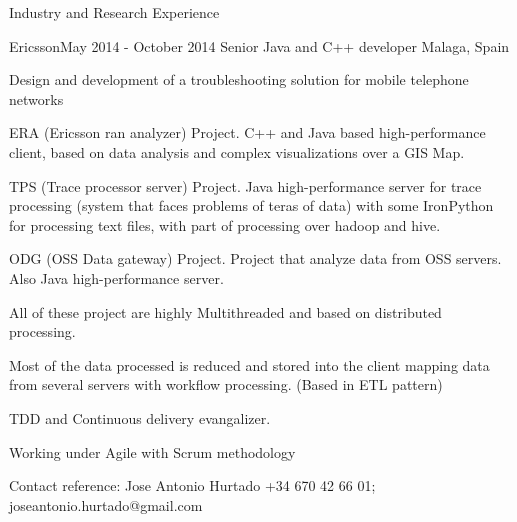 \documentclass{resume} %
\begin{document}
\begin{rSection}{Industry and Research Experience}
		
\begin{rSubsection}{Ericsson}{May 2014 - October 2014 }{ Senior Java and C++ developer }{Malaga, Spain}
	\item Design and development of a troubleshooting solution for mobile telephone networks
	\item ERA (Ericsson ran analyzer) Project. C++ and Java based high-performance client, based on data analysis and complex visualizations over a GIS Map.
	\item TPS (Trace processor server) Project. Java high-performance server for trace processing (system that faces problems of teras of data) with some IronPython for processing text files, with part of processing over hadoop and hive.
	\item ODG (OSS Data gateway) Project. Project that analyze data from OSS servers. Also Java high-performance server. 
	\item All of these project are highly Multithreaded and based on distributed processing.  
	\item Most of the data processed is reduced and stored into the client mapping data from several servers with workflow processing. (Based in ETL pattern)
	\item TDD and Continuous delivery evangalizer.
	\item Working under Agile with Scrum methodology
	\item Contact reference: Jose Antonio Hurtado +34 670 42 66 01; joseantonio.hurtado@gmail.com
	
\end{rSubsection}



\end{rSection}
\end{document}
